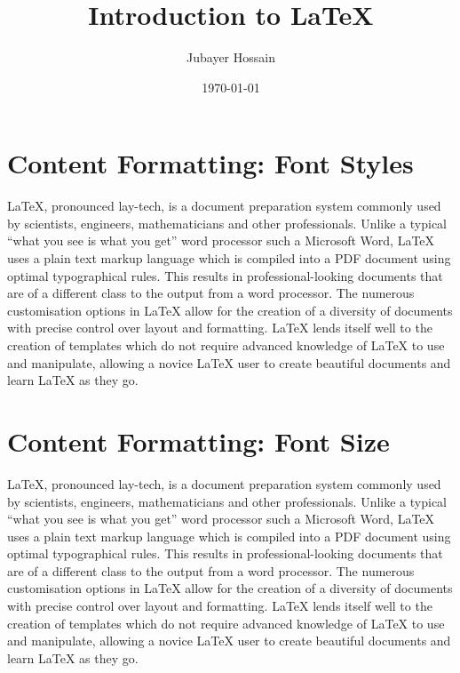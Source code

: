 \documentclass{article}
\title{Introduction to {\LaTeX}}
\author{Jubayer Hossain}
\date{\today}
\begin{document}
	\maketitle 
	
	\section*{Content Formatting: Font Styles}
	LaTeX, pronounced lay-tech, is a document preparation system commonly used 
	by scientists, engineers, mathematicians and other professionals. Unlike a 
	typical “what you see is what you get” word processor such a Microsoft 
	Word, LaTeX uses a plain text markup language which is compiled into a PDF 
	document using optimal typographical rules. This results in 
	professional-looking documents that are of a different class to the output 
	from a word processor. The numerous customisation options in LaTeX allow 
	for the creation of a diversity of documents with precise control over 
	layout and formatting. LaTeX lends itself well to the creation of templates 
	which do not require advanced knowledge of LaTeX to use and manipulate, 
	allowing a novice LaTeX user to create beautiful documents and learn LaTeX 
	as they go.
	
	
	\section*{Content Formatting: Font Size}
	LaTeX, pronounced lay-tech, is a document preparation system commonly used 
	by scientists, engineers, mathematicians and other professionals. Unlike a 
	typical “what you see is what you get” word processor such a Microsoft 
	Word, LaTeX uses a plain text markup language which is compiled into a PDF 
	document using optimal typographical rules. This results in 
	professional-looking documents that are of a different class to the output 
	from a word processor. The numerous customisation options in LaTeX allow 
	for the creation of a diversity of documents with precise control over 
	layout and formatting. LaTeX lends itself well to the creation of templates 
	which do not require advanced knowledge of LaTeX to use and manipulate, 
	allowing a novice LaTeX user to create beautiful documents and learn LaTeX 
	as they go.
	
\end{document}
